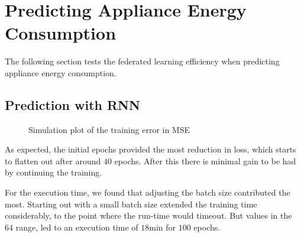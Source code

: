 \documentclass[a4paper, article, oneside, USenglish, IN5460]{memoir}
\begin{document}
\chapter{Predicting Appliance Energy Consumption}

The following section tests the federated learning efficiency when predicting appliance energy consumption.

\section{Prediction with RNN}

\begin{figure}[H]
  \centering
    
  \caption{Simulation plot of the training error in MSE}
\end{figure}

As expected, the initial epochs provided the most reduction in loss, which starts to flatten out after around $40$ epochs. After this there is minimal gain to be had by continuing the training. 

For the execution time, we found that adjusting the batch size contributed the most. Starting out with a small batch size extended the training time considerably, to the point where the run-time would timeout. But values in the $64$ range, led to an execution time of $18$min for $100$ epochs.  
\end{document}
